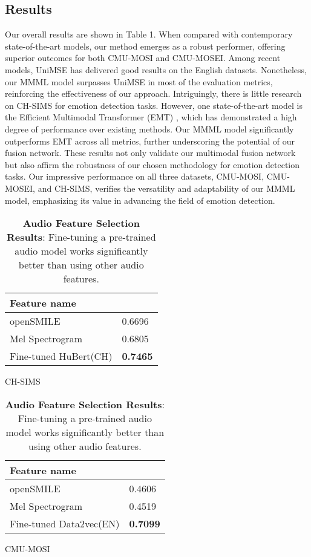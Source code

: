 \documentclass[11pt]{article}
\begin{document}
\subsection{Results}
Our overall results are shown in Table 1. When compared with contemporary state-of-the-art models, our method emerges as a robust performer, offering superior outcomes for both CMU-MOSI and CMU-MOSEI. Among recent models, UniMSE \cite{hu-etal-2022-unimse} has delivered good results on the English datasets. Nonetheless, our MMML model surpasses UniMSE in most of the evaluation metrics, reinforcing the effectiveness of our approach.  Intriguingly, there is little research on CH-SIMS for emotion detection tasks. However, one state-of-the-art model is the Efficient Multimodal Transformer (EMT) \cite{Sun_2023}, which has demonstrated a high degree of performance over existing methods. Our MMML model significantly outperforms EMT across all metrics, further underscoring the potential of our fusion network.
These results not only validate our multimodal fusion network but also affirm the robustness of our chosen methodology for emotion detection tasks. Our impressive performance on all three datasets, CMU-MOSI, CMU-MOSEI, and CH-SIMS, verifies the versatility and adaptability of our MMML model, emphasizing its value in advancing the field of emotion detection.

\begin{table}
\begin{subtable}{0.15\textwidth}
\begin{tabular}{ll}
\hline
\textbf{Feature name} &  \\ \hline
openSMILE             & 0.6696               \\ 
Mel Spectrogram       & 0.6805               \\ 
Fine-tuned HuBert(CH) & \textbf{0.7465}       \\ \hline
\end{tabular}
\caption{CH-SIMS}
\label{tab:dataset2}
\end{subtable}

\vspace{0.3cm}

\begin{subtable}{0.15\textwidth}
\begin{tabular}{ll}
\hline
\textbf{Feature name} &  \\ \hline
openSMILE             & 0.4606               \\ 
Mel Spectrogram       & 0.4519               \\ 
Fine-tuned Data2vec(EN) & \textbf{0.7099}     \\ \hline
\end{tabular}
\caption{CMU-MOSI}
\label{tab:dataset1}
\end{subtable}
\caption{\textbf{Audio Feature Selection Results}: Fine-tuning a pre-trained audio model works significantly better than using other audio features.}
\label{tab:Performance2}
\end{table}
\end{document}
